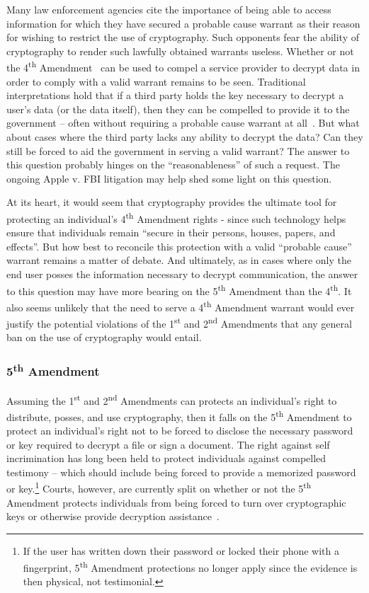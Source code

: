 Many law enforcement agencies cite the importance of being able to
access information for which they have secured a probable cause
warrant as their reason for wishing to restrict the use of
cryptography. Such opponents fear the ability of cryptography to
render such lawfully obtained warrants useless. Whether or not the
4\textsuperscript{th} Amendment~\cite{us-constitution-amend4} can be
used to compel a service provider to decrypt data in order to comply
with a valid warrant remains to be seen. Traditional interpretations
hold that if a third party holds the key necessary to decrypt a user's
data (or the data itself), then they can be compelled to provide it to
the government -- often without requiring a probable cause warrant at
all~\cite{thompson-thirdparty}. But what about cases where the third
party lacks any ability to decrypt the data? Can they still be forced
to aid the government in serving a valid warrant?  The answer to this
question probably hinges on the ``reasonableness'' of such a
request. The ongoing Apple v. FBI litigation may help shed some light
on this question.

At its heart, it would seem that cryptography provides the ultimate
tool for protecting an individual's 4\textsuperscript{th} Amendment
rights - since such technology helps ensure that individuals remain
``secure in their persons, houses, papers, and effects''. But how best
to reconcile this protection with a valid ``probable cause'' warrant
remains a matter of debate. And ultimately, as in cases where only the
end user posses the information necessary to decrypt communication,
the answer to this question may have more bearing on the
5\textsuperscript{th} Amendment than the 4\textsuperscript{th}.  It
also seems unlikely that the need to serve a 4\textsuperscript{th}
Amendment warrant would ever justify the potential violations of the
1\textsuperscript{st} and 2\textsuperscript{nd} Amendments that any
general ban on the use of cryptography would entail.

\subsubsection{5\textsuperscript{th} Amendment}

Assuming the 1\textsuperscript{st} and 2\textsuperscript{nd}
Amendments can protects an individual's right to distribute, posses,
and use cryptography, then it falls on the 5\textsuperscript{th}
Amendment to protect an individual's right not to be forced to
disclose the necessary password or key required to decrypt a file or
sign a document. The right against self incrimination has long been
held to protect individuals against compelled testimony -- which
should include being forced to provide a memorized password or
key.\footnote{If the user has written down their password or locked
  their phone with a fingerprint, 5\textsuperscript{th} Amendment
  protections no longer apply since the evidence is then physical, not
  testimonial.}  Courts, however, are currently split on whether or
not the 5\textsuperscript{th} Amendment protects individuals from
being forced to turn over cryptographic keys or otherwise provide
decryption assistance~\cite{usvboucher, commonwealthvgelfgatt,
  usvdoe}.

